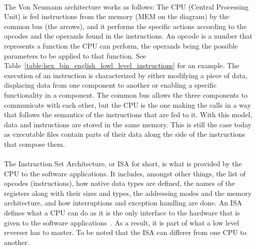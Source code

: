 \paragraph{}
The Von Neumann architecture works as follows: The CPU (Central Processing Unit) is fed instructions from the memory (MEM on the diagram) by the common bus (the arrows), and it performs the specific actions according to the opcodes and the operands found in the instructions. An opcode is a number that represents a function the CPU can perform, the operands being the possible parameters to be applied to that function. See Table~\ref{table:hex_bin_english_lowl_level_instructions} for an example. The execution of an instruction is characterized by either modifying a piece of data, displacing data from one component to another or enabling a specific functionality in a component. The common bus allows the three components to communicate with each other, but the CPU is the one making the calls in a way that follows the semantics of the instructions that are fed to it. With this model, data and instructions are stored in the same memory. This is still the case today as executable files contain parts of their data along the side of the instructions that compose them.

\paragraph{}
The Instruction Set Architecture, or ISA for short, is what is provided by the CPU to the software applications. It includes, amongst other things, the list of opcodes (instructions), how native data types are defined, the names of the registers along with their sizes and types, the addressing modes and the memory architecture, and how interruptions and exception handling are done. An ISA defines what a CPU can do as it is the only interface to the hardware that is given to the software applications~\cite{microarchitecture2015dragomir}. As a result, it is part of what a low level reverser has to master. To be noted that the ISA can differer from one CPU to another.

